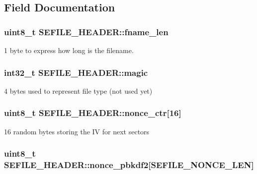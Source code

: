 \subsection{Field Documentation}
\hypertarget{struct_s_e_f_i_l_e___h_e_a_d_e_r_a6ef79b4f4b76a57b2610bda99f34afdc}{
\subsubsection[{fname\-\_\-len}]{\setlength{\rightskip}{0pt plus 5cm}uint8\-\_\-t S\-E\-F\-I\-L\-E\-\_\-\-H\-E\-A\-D\-E\-R\-::fname\-\_\-len}}\label{struct_s_e_f_i_l_e___h_e_a_d_e_r_a6ef79b4f4b76a57b2610bda99f34afdc}
1 byte to express how long is the filename. \hypertarget{struct_s_e_f_i_l_e___h_e_a_d_e_r_a552830c2eab29ca1ce93f18cf8aff306}{
\subsubsection[{magic}]{\setlength{\rightskip}{0pt plus 5cm}int32\-\_\-t S\-E\-F\-I\-L\-E\-\_\-\-H\-E\-A\-D\-E\-R\-::magic}}\label{struct_s_e_f_i_l_e___h_e_a_d_e_r_a552830c2eab29ca1ce93f18cf8aff306}
4 bytes used to represent file type (not used yet) \hypertarget{struct_s_e_f_i_l_e___h_e_a_d_e_r_adcb7b8a5fc9e93d1fbf348b144883bf9}{
\subsubsection[{nonce\-\_\-ctr}]{\setlength{\rightskip}{0pt plus 5cm}uint8\-\_\-t S\-E\-F\-I\-L\-E\-\_\-\-H\-E\-A\-D\-E\-R\-::nonce\-\_\-ctr\mbox{[}16\mbox{]}}}\label{struct_s_e_f_i_l_e___h_e_a_d_e_r_adcb7b8a5fc9e93d1fbf348b144883bf9}
16 random bytes storing the I\-V for next sectors \hypertarget{struct_s_e_f_i_l_e___h_e_a_d_e_r_a7ebb6ac2da3fc9384e1ed12cdbbeb03c}{
\subsubsection[{nonce\-\_\-pbkdf2}]{\setlength{\rightskip}{0pt plus 5cm}uint8\-\_\-t S\-E\-F\-I\-L\-E\-\_\-\-H\-E\-A\-D\-E\-R\-::nonce\-\_\-pbkdf2\mbox{[}S\-E\-F\-I\-L\-E\-\_\-\-N\-O\-N\-C\-E\-\_\-\-L\-E\-N\mbox{]}}}\label{struct_s_e_f_i_l_e___h_e_a_d_e_r_a7ebb6ac2da3fc9384e1ed12cdbbeb03c}
